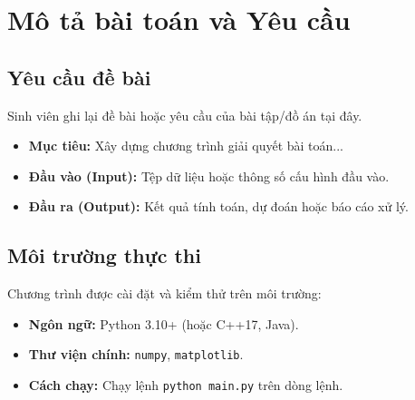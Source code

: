 \section{Mô tả bài toán và Yêu cầu}

\subsection{Yêu cầu đề bài}
Sinh viên ghi lại đề bài hoặc yêu cầu của bài tập/đồ án tại đây.

\begin{itemize}
    \item \textbf{Mục tiêu:} Xây dựng chương trình giải quyết bài toán...
    \item \textbf{Đầu vào (Input):} Tệp dữ liệu hoặc thông số cấu hình đầu vào.
    \item \textbf{Đầu ra (Output):} Kết quả tính toán, dự đoán hoặc báo cáo xử lý.
\end{itemize}

\subsection{Môi trường thực thi}
Chương trình được cài đặt và kiểm thử trên môi trường:
\begin{itemize}
    \item \textbf{Ngôn ngữ:} Python 3.10+ (hoặc C++17, Java).
    \item \textbf{Thư viện chính:} \texttt{numpy}, \texttt{matplotlib}.
    \item \textbf{Cách chạy:} Chạy lệnh \texttt{python main.py} trên dòng lệnh.
\end{itemize}
